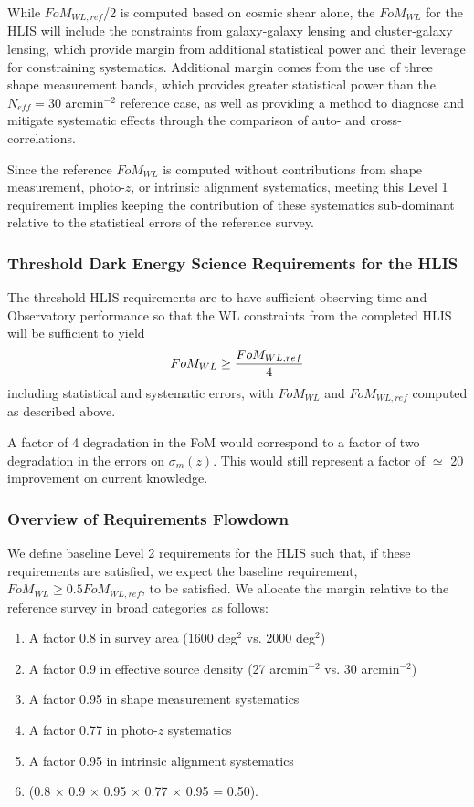 While $FoM_{WL,ref}$/2 is computed based on cosmic shear alone, the $FoM_{WL}$
for the HLIS will include the constraints from galaxy-galaxy lensing and
cluster-galaxy lensing, which provide margin from additional statistical power
and their leverage for constraining systematics.  Additional margin comes from
the use of three shape measurement bands, which provides greater statistical
power than the $N_{eff}= 30$ arcmin$^{-2}$ reference case, as well as providing a method
to diagnose and mitigate systematic effects through the comparison of auto- and
cross-correlations.

Since the reference $FoM_{WL}$ is computed without contributions from shape
measurement, photo-$z$, or intrinsic alignment systematics, meeting this Level 1
requirement implies keeping the contribution of these systematics sub-dominant
relative to the statistical errors of the reference survey.

\subsubsection{Threshold Dark Energy Science Requirements for the HLIS}

The threshold HLIS requirements are to have sufficient observing time and
Observatory performance so that the WL constraints from the completed HLIS will
be sufficient to yield
\begin{eqnarray}
FoM_{WL}\geq {FoM_{WL,ref}\over 4}
\end{eqnarray}
including statistical and systematic errors, with $FoM_{WL}$ and $FoM_{WL,ref}$ computed as described above.

A factor of 4 degradation in the FoM would correspond to a factor of two
degradation in the errors on $\sigma_m(z)$.  This would still represent a factor
of $\simeq$ 20 improvement on current knowledge.

\subsubsection{Overview of Requirements Flowdown}

We define baseline Level 2 requirements for the HLIS such that, if these
requirements are satisfied, we expect the baseline requirement, $FoM_{WL}\geq
0.5 FoM_{WL,ref}$, to be satisfied. We allocate the margin relative to the
reference survey in broad categories as follows:
\begin{enumerate}
\item	A factor 0.8 in survey area (1600 deg$^2$ vs. 2000 deg$^2$)
\item	A factor 0.9 in effective source density (27 arcmin$^{-2}$ vs. 30 arcmin$^{-2}$)
\item	A factor 0.95 in shape measurement systematics
\item	A factor 0.77 in photo-$z$ systematics
\item	A factor 0.95 in intrinsic alignment systematics
\item (0.8 × 0.9 × 0.95 × 0.77 × 0.95 = 0.50).
\end{enumerate}

